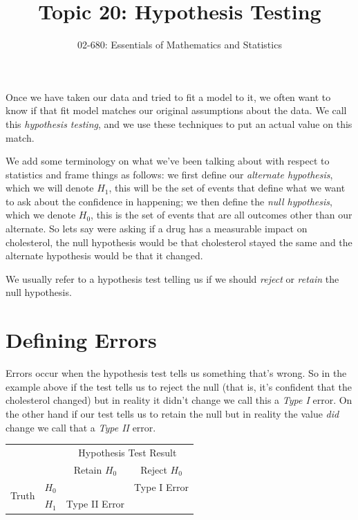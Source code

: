 

\title{Topic 20: Hypothesis Testing}
\author{02-680: Essentials of Mathematics and Statistics}


\maketitle

Once we have taken our data and tried to fit a model to it, 
we often want to know if that fit model matches our original assumptions about the data. 
We call this \emph{hypothesis testing}, 
and we use these techniques to put an actual value on this match. 

We add some terminology on what we've been talking about with respect to statistics 
and frame things as follows: 
we first define our \emph{alternate hypothesis}, which we will denote $H_1$, 
this will be the set of events that define what we want to ask about the confidence in happening; 
we then define the \emph{null hypothesis}, which we denote $H_0$, 
this is the set of events that are all outcomes other than our alternate. 
So lets say were asking if a drug has a measurable impact on cholesterol, 
the null hypothesis would be that cholesterol stayed the same 
and the alternate hypothesis would be that it changed. 

We usually refer to a hypothesis test telling us if we should \emph{reject} or \emph{retain} the null hypothesis. 

\section{Defining Errors}
Errors occur when the hypothesis test tells us something that's wrong. 
So in the example above 
if the test tells us to reject the null (that is, it's confident that the cholesterol changed) 
but in reality it didn't change we call this a \emph{Type I} error. 
On the other hand if our test tells us to retain the null but in reality the value \textit{did} change 
we call that a \emph{Type II} error. 

\begin{center}
\begin{tabular}{|cc||c|c|}
\hline
&& \multicolumn{2}{c|}{Hypothesis Test Result}\\
&& Retain $H_0$ & Reject $H_0$\\
\hline \hline
\multirow{2}{*}{Truth} & $H_0$ & & Type I Error\\
\cline{2-4}
& $H_1$ & Type II Error & \\
\hline
\end{tabular}
\end{center}

